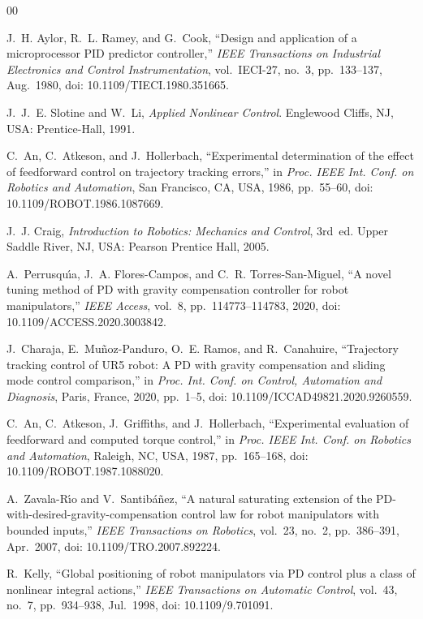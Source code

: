 \documentclass[conference]{IEEEtran}
\begin{document}
\begin{thebibliography}{00}

	J.~H. Aylor, R.~L. Ramey, and G.~Cook,
	``Design and application of a microprocessor PID predictor controller,''
	\emph{IEEE Transactions on Industrial Electronics and Control Instrumentation},
	vol.~IECI-27, no.~3, pp.~133--137, Aug.~1980,
	doi: 10.1109/TIECI.1980.351665.
	
	J.~J.~E. Slotine and W.~Li,
	\emph{Applied Nonlinear Control}.
	Englewood Cliffs, NJ, USA: Prentice-Hall, 1991.
	
	C.~An, C.~Atkeson, and J.~Hollerbach,
	``Experimental determination of the effect of feedforward control on trajectory tracking errors,''
	in \emph{Proc. IEEE Int. Conf. on Robotics and Automation},
	San Francisco, CA, USA, 1986, pp.~55--60,
	doi: 10.1109/ROBOT.1986.1087669.
	
	J.~J. Craig,
	\emph{Introduction to Robotics: Mechanics and Control},
	3rd~ed.
	Upper Saddle River, NJ, USA: Pearson Prentice Hall, 2005.
	
	A.~Perrusqu\'{\i}a, J.~A. Flores-Campos, and C.~R. Torres-San-Miguel,
	``A novel tuning method of PD with gravity compensation controller for robot manipulators,''
	\emph{IEEE Access},
	vol.~8, pp.~114773--114783, 2020,
	doi: 10.1109/ACCESS.2020.3003842.
	
	J.~Charaja, E.~Mu\~noz-Panduro, O.~E. Ramos, and R.~Canahuire,
	``Trajectory tracking control of UR5 robot: A PD with gravity compensation and sliding mode control comparison,''
	in \emph{Proc. Int. Conf. on Control, Automation and Diagnosis},
	Paris, France, 2020, pp.~1--5,
	doi: 10.1109/ICCAD49821.2020.9260559.
	
	C.~An, C.~Atkeson, J.~Griffiths, and J.~Hollerbach,
	``Experimental evaluation of feedforward and computed torque control,''
	in \emph{Proc. IEEE Int. Conf. on Robotics and Automation},
	Raleigh, NC, USA, 1987, pp.~165--168,
	doi: 10.1109/ROBOT.1987.1088020.
	
	A.~Zavala-R\'{\i}o and V.~Santib\'a\~nez,
	``A natural saturating extension of the PD-with-desired-gravity-compensation control law for robot manipulators with bounded inputs,''
	\emph{IEEE Transactions on Robotics},
	vol.~23, no.~2, pp.~386--391, Apr.~2007,
	doi: 10.1109/TRO.2007.892224.
	
	R.~Kelly,
	``Global positioning of robot manipulators via PD control plus a class of nonlinear integral actions,''
	\emph{IEEE Transactions on Automatic Control},
	vol.~43, no.~7, pp.~934--938, Jul.~1998,
	doi: 10.1109/9.701091.
	

\end{thebibliography}
\end{document}
